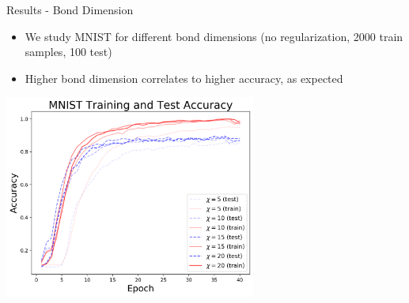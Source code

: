 \documentclass[llpt]{beamer}
\begin{document}
\begin{frame}{Results - Bond Dimension}
    \begin{itemize}
        \item We study MNIST for different bond dimensions (no regularization, 2000 train samples, 100 test)
        \item Higher bond dimension correlates to higher accuracy, as expected
    \end{itemize}
    \qquad  \qquad \qquad
    \includegraphics[width=0.62\textwidth]{MNIST_accuracies.png}
\end{frame}
\end{document}
